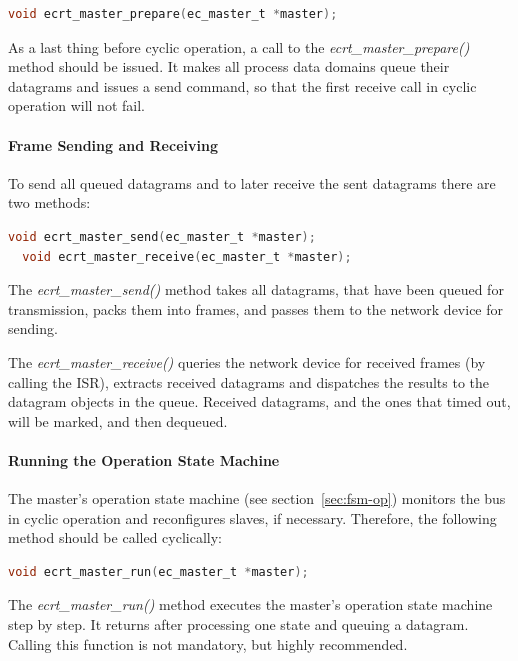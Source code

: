 \documentclass[a4paper,12pt,BCOR6mm,bibtotoc,idxtotoc]{scrbook}
\begin{document}
\begin{lstlisting}[language=C]
  void ecrt_master_prepare(ec_master_t *master);
\end{lstlisting}

As a last thing before cyclic operation, a call to the
\textit{ecrt\_master\_prepare()} method should be issued. It makes all
process data domains queue their datagrams and issues a send command,
so that the first receive call in cyclic operation will not fail.

\paragraph{Frame Sending and Receiving}

To send all queued datagrams and to later receive the sent datagrams
there are two methods:

\begin{lstlisting}[language=C]
  void ecrt_master_send(ec_master_t *master);
  void ecrt_master_receive(ec_master_t *master);
\end{lstlisting}

The \textit{ecrt\_master\_send()} method takes all datagrams, that
have been queued for transmission, packs them into frames, and passes
them to the network device for sending.

The \textit{ecrt\_master\_receive()} queries the network device for
received frames (by calling the ISR), extracts received
datagrams and dispatches the results to the datagram objects in the
queue. Received datagrams, and the ones that timed out, will be
marked, and then dequeued.

\paragraph{Running the Operation State Machine}

The master's operation state machine (see section~\ref{sec:fsm-op})
monitors the bus in cyclic operation and reconfigures slaves, if
necessary. Therefore, the following method should be called
cyclically:

\begin{lstlisting}[language=C]
  void ecrt_master_run(ec_master_t *master);
\end{lstlisting}

The \textit{ecrt\_master\_run()} method executes the master's
operation state machine step by step. It returns after processing one
state and queuing a datagram. Calling this function is not mandatory,
but highly recommended.
\end{document}
